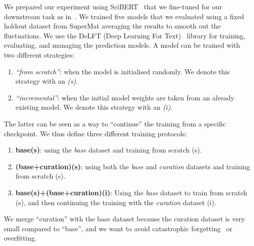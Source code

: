 We prepared our experiment using SciBERT~\cite{Beltagy2019SciBERT} that we fine-tuned for our downstream task as in~\cite{foppiano2023automatic}. 
We trained five models that we evaluated using a fixed holdout dataset from SuperMat averaging the results to smooth out the fluctuations. 
We use the DeLFT (Deep Learning For Text)~\cite{delft} library for training, evaluating, and managing the prediction models.  
A model can be trained with two different strategies: 
\begin{enumerate}
    \item \emph{``from scratch''}: when the model is initialised randomly. We denote this strategy with an \emph{(s)}.
    \item \emph{``incremental''}: when the initial model weights are taken from an already existing model. We denote this strategy with an \emph{(i)}.
\end{enumerate}
The latter can be seen as a way to ``continue'' the training from a specific checkpoint.
We thus define three different training protocols: 
\begin{enumerate}
    \item \textbf{base(s)}: using the \emph{base} dataset and training from scratch (s).
    \item \textbf{(base+curation)(s)}: using both the \emph{base} and \emph{curation} datasets and training from scratch (s).
    \item \textbf{base(s)+(base+curation)(i)}: Using the \emph{base} dataset to train from scratch (s), and then continuing the training with the \emph{curation} dataset (i).
\end{enumerate}
We merge ``curation'' with the base dataset because the curation dataset is very small compared to ``base'', and we want to avoid catastrophic forgetting~\cite{overcoming-kirkpatrick-etal-2016} or overfitting.

